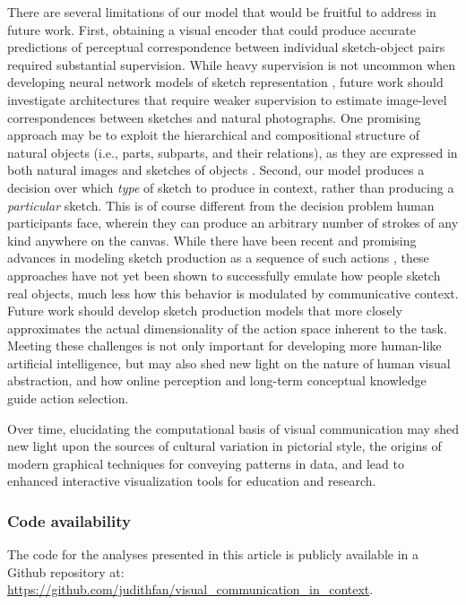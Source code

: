 \documentclass[9pt,twocolumn,twoside]{pnas-new}
\begin{document}
There are several limitations of our model that would be fruitful to address in future work. 
First, obtaining a visual encoder that could produce accurate predictions of perceptual correspondence between individual sketch-object pairs required substantial supervision. 
While heavy supervision is not uncommon when developing neural network models of sketch representation \cite{sangkloy2016sketchy,yu2017sketch,song2017deep}, future work should investigate architectures that require weaker supervision to estimate image-level correspondences between sketches and natural photographs. 
One promising approach may be to exploit the hierarchical and compositional structure of natural objects (i.e., parts, subparts, and their relations), as they are expressed in both natural images and sketches of objects \cite{battaglia2016interaction,mrowca2018graph}.
Second, our model produces a decision over which \textit{type} of sketch to produce in context, rather than producing a \textit{particular} sketch.  
This is of course different from the decision problem human participants face, wherein they can produce an arbitrary number of strokes of any kind anywhere on the canvas. 
While there have been recent and promising advances in modeling sketch production as a sequence of such actions \cite{lake2015human,ha2017neural,ganin2018synthesizing}, these approaches have not yet been shown to successfully emulate how people sketch real objects, much less how this behavior is modulated by communicative context. 
Future work should develop sketch production models that more closely approximates the actual dimensionality of the action space inherent to the task.
Meeting these challenges is not only important for developing more human-like artificial intelligence, but may also shed new light on the nature of human visual abstraction, and how online perception and long-term conceptual knowledge guide action selection. 

Over time, elucidating the computational basis of visual communication may shed new light upon the sources of cultural variation in pictorial style, the origins of modern graphical techniques for conveying patterns in data, and lead to enhanced interactive visualization tools for education and research.

\subsubsection*{Code availability} The code for the analyses presented in this article is publicly available in a Github repository at: \url{https://github.com/judithfan/visual_communication_in_context}.
\end{document}
